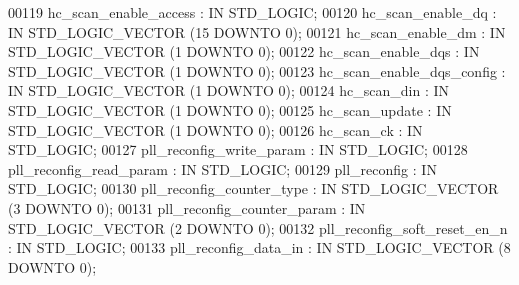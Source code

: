 \begin{DoxyCode}
{00119         hc_scan_enable_access   : \textcolor{keywordflow}{IN} \textcolor{comment}{STD\_LOGIC};
00120         hc_scan_enable_dq   : \textcolor{keywordflow}{IN} \textcolor{comment}{STD\_LOGIC\_VECTOR} (\textcolor{vhdllogic}{}\textcolor{vhdllogic}{15} \textcolor{keywordflow}{DOWNTO} \textcolor{vhdllogic}{}\textcolor{vhdllogic}{0});
00121         hc_scan_enable_dm   : \textcolor{keywordflow}{IN} \textcolor{comment}{STD\_LOGIC\_VECTOR} (\textcolor{vhdllogic}{}\textcolor{vhdllogic}{1} \textcolor{keywordflow}{DOWNTO} \textcolor{vhdllogic}{}\textcolor{vhdllogic}{0});
00122         hc_scan_enable_dqs  : \textcolor{keywordflow}{IN} \textcolor{comment}{STD\_LOGIC\_VECTOR} (\textcolor{vhdllogic}{}\textcolor{vhdllogic}{1} \textcolor{keywordflow}{DOWNTO} \textcolor{vhdllogic}{}\textcolor{vhdllogic}{0});
00123         hc_scan_enable_dqs_config   : \textcolor{keywordflow}{IN} \textcolor{comment}{STD\_LOGIC\_VECTOR} (\textcolor{vhdllogic}{}\textcolor{vhdllogic}{1} \textcolor{keywordflow}{DOWNTO} \textcolor{vhdllogic}{}\textcolor{vhdllogic}{0});
00124         hc_scan_din : \textcolor{keywordflow}{IN} \textcolor{comment}{STD\_LOGIC\_VECTOR} (\textcolor{vhdllogic}{}\textcolor{vhdllogic}{1} \textcolor{keywordflow}{DOWNTO} \textcolor{vhdllogic}{}\textcolor{vhdllogic}{0});
00125         hc_scan_update  : \textcolor{keywordflow}{IN} \textcolor{comment}{STD\_LOGIC\_VECTOR} (\textcolor{vhdllogic}{}\textcolor{vhdllogic}{1} \textcolor{keywordflow}{DOWNTO} \textcolor{vhdllogic}{}\textcolor{vhdllogic}{0});
00126         hc_scan_ck  : \textcolor{keywordflow}{IN} \textcolor{comment}{STD\_LOGIC};
00127         pll_reconfig_write_param    : \textcolor{keywordflow}{IN} \textcolor{comment}{STD\_LOGIC};
00128         pll_reconfig_read_param : \textcolor{keywordflow}{IN} \textcolor{comment}{STD\_LOGIC};
00129         pll_reconfig    : \textcolor{keywordflow}{IN} \textcolor{comment}{STD\_LOGIC};
00130         pll_reconfig_counter_type   : \textcolor{keywordflow}{IN} \textcolor{comment}{STD\_LOGIC\_VECTOR} (\textcolor{vhdllogic}{}\textcolor{vhdllogic}{3} \textcolor{keywordflow}{DOWNTO} \textcolor{vhdllogic}{}\textcolor{vhdllogic}{0});
00131         pll_reconfig_counter_param  : \textcolor{keywordflow}{IN} \textcolor{comment}{STD\_LOGIC\_VECTOR} (\textcolor{vhdllogic}{}\textcolor{vhdllogic}{2} \textcolor{keywordflow}{DOWNTO} \textcolor{vhdllogic}{}\textcolor{vhdllogic}{0});
00132         pll_reconfig_soft_reset_en_n    : \textcolor{keywordflow}{IN} \textcolor{comment}{STD\_LOGIC};
00133         pll_reconfig_data_in    : \textcolor{keywordflow}{IN} \textcolor{comment}{STD\_LOGIC\_VECTOR} (\textcolor{vhdllogic}{}\textcolor{vhdllogic}{8} \textcolor{keywordflow}{DOWNTO} \textcolor{vhdllogic}{}\textcolor{vhdllogic}{0});
}
\end{DoxyCode}
